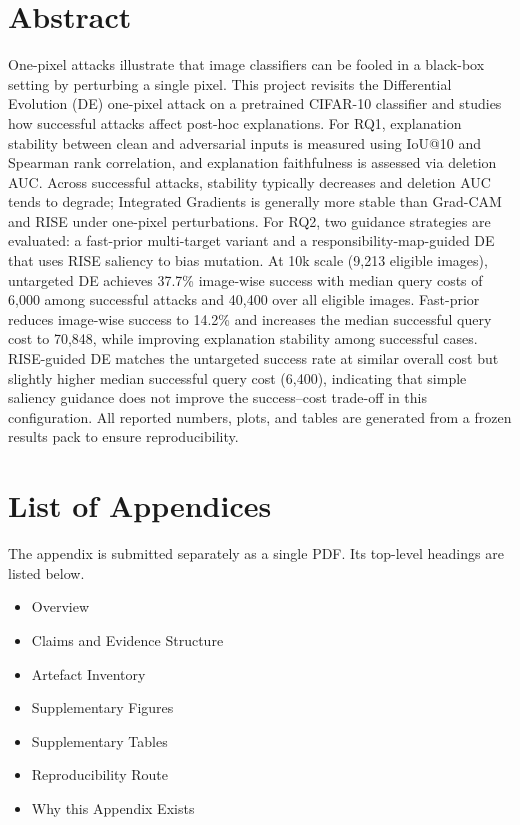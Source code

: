 \documentclass[11pt,a4paper]{article}
\begin{document}
\section*{Abstract}
One-pixel attacks illustrate that image classifiers can be fooled in a black-box setting by perturbing a single pixel.
This project revisits the Differential Evolution (DE) one-pixel attack on a pretrained CIFAR-10 classifier and studies how successful attacks affect post-hoc explanations.
For RQ1, explanation stability between clean and adversarial inputs is measured using IoU@10 and Spearman rank correlation, and explanation faithfulness is assessed via deletion AUC.
Across successful attacks, stability typically decreases and deletion AUC tends to degrade; Integrated Gradients is generally more stable than Grad-CAM and RISE under one-pixel perturbations.
For RQ2, two guidance strategies are evaluated: a fast-prior multi-target variant and a responsibility-map-guided DE that uses RISE saliency to bias mutation.
At 10k scale (9{,}213 eligible images), untargeted DE achieves 37.7\% image-wise success with median query costs of 6{,}000 among successful attacks and 40{,}400 over all eligible images.
Fast-prior reduces image-wise success to 14.2\% and increases the median successful query cost to 70{,}848, while improving explanation stability among successful cases.
RISE-guided DE matches the untargeted success rate at similar overall cost but slightly higher median successful query cost (6{,}400), indicating that simple saliency guidance does not improve the success--cost trade-off in this configuration.
All reported numbers, plots, and tables are generated from a frozen results pack to ensure reproducibility.

\clearpage

\tableofcontents

\clearpage
{}
\section*{List of Appendices}

The appendix is submitted separately as a single PDF. Its top-level headings are listed below.

\begin{itemize}
    \item Overview
    \item Claims and Evidence Structure
    \item Artefact Inventory
    \item Supplementary Figures
    \item Supplementary Tables
    \item Reproducibility Route
    \item Why this Appendix Exists
\end{itemize}
\end{document}
